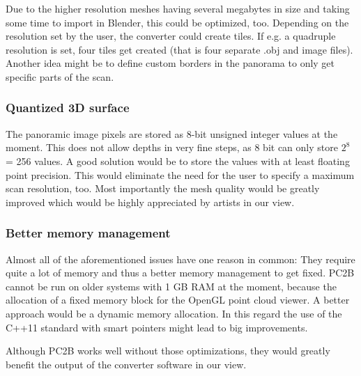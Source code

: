 Due to the higher resolution meshes having several megabytes in size and taking some time to import in Blender, this could be optimized, too.
Depending on the resolution set by the user, the converter could create tiles. If e.g. a quadruple resolution is set, four tiles get created (that is four separate .obj and image files). Another idea might be to define custom borders in the panorama to only get specific parts of the scan.

\subsubsection{Quantized 3D surface}

The panoramic image pixels are stored as 8-bit unsigned integer values at the moment. This does not allow depths in very fine steps, as 8 bit can only store $2^{8}$ = 256 values. A good solution would be to store the values with at least floating point precision. This would eliminate the need for the user to specify a maximum scan resolution, too. Most importantly the mesh quality would be greatly improved which would be highly appreciated by artists in our view.

\subsubsection{Better memory management}

Almost all of the aforementioned issues have one reason in common: They require quite a lot of memory and thus a better memory management to get fixed. PC2B cannot be run on older systems with 1 GB RAM at the moment, because the allocation of a fixed memory block for the OpenGL point cloud viewer. A better approach would be a dynamic memory allocation. In this regard the use of the C++11 standard with smart pointers might lead to big improvements.

Although PC2B works well without those optimizations, they would greatly benefit the output of the converter software in our view.